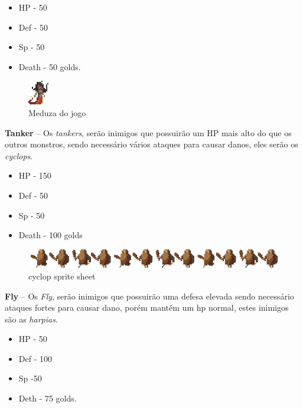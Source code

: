 \documentclass[11pt]{article} %
\begin{document}
\begin{itemize}
\item HP - 50
\item Def - 50
\item Sp - 50
\item Death - 50 golds.
\end{itemize}

\begin{figure}[!htp]
\centering
\includegraphics[scale=4]{res/characters/medusa.png}
\caption{Meduza do jogo}
\label{Meduza}
\end{figure}

\newpage

\textbf{{\large Tanker}} – Os \textit{tankers}, serão inimigos que possuirão um HP mais alto do que os outros monstros, sendo necessário vários ataques para causar danos, eles serão os \textit{cyclops}.
\begin{itemize}
\item HP - 150
\item Def - 50
\item Sp - 50
\item Death - 100 golds
\end{itemize}

\begin{figure}[!htp]
\centering
\includegraphics[scale=1]{res/characters/cyclop.png} 
\caption{cyclop sprite sheet}
\label{cyclops}
\end{figure}

\newpage

\textbf{{\large Fly}} – Os \textit{Fly}, serão inimigos que possuirão uma defesa elevada sendo necessário ataques fortes para causar dano, porém mantém um hp normal, estes inimigos são as \textit{harpias}.
\begin{itemize}
\item HP - 50
\item Def - 100
\item Sp -50
\item Deth - 75 golds.
\end{itemize}
\end{document}
